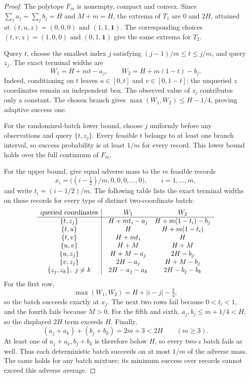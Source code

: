 \documentclass[12pt]{article}
\begin{document}
\begin{proof}
The polytope $F_m$ is nonempty, compact and convex. Since
$\sum_j a_j=\sum_j b_j=H$ and $M+m=H$, the extrema of $T_1$ are
$0$ and $2H$, attained at $(t,u,z)=(0,0,0)$ and $(1,1,\boldsymbol1)$.
The corresponding choices $(t,v,z)=(1,0,0)$ and
$(0,1,\boldsymbol1)$ give the same extrema for $T_2$.

Query $t$, choose the smallest index $j$ satisfying
$(j-1)/m\leq t\leq j/m$, and query $z_j$. The exact terminal widths are
\begin{equation}
 W_1=H+mt-a_j,\qquad W_2=H+m(1-t)-b_j.
 \label{eq:two-target-boundary-widths}
\end{equation}
Indeed, conditioning on $t$ leaves $u\in[0,t]$ and $v\in[0,1-t]$;
the unqueried $z$ coordinates remain an independent box. The observed
value of $z_j$ contributes only a constant. The chosen branch gives
$\max(W_1,W_2)\leq H-1/4$, proving adaptive success one.

For the randomized-batch lower bound, choose $j$ uniformly before any
observations and query $\{t,z_j\}$. Every feasible $t$ belongs to at least
one branch interval, so success probability is at least $1/m$ for every
record. This lower bound holds over the full continuum of $F_m$.

For the upper bound, give equal adverse mass to the $m$ feasible records
\[
 x_i=\bigl((i-\tfrac12)/m,0,0,0,\ldots,0\bigr),
       \qquad i=1,\ldots,m,
\]
and write $t_i=(i-1/2)/m$. The following table lists the exact terminal
widths on these records for every type of distinct two-coordinate batch:
\[
\begin{array}{c|@{\quad}c@{\quad}c}
\text{queried coordinates}&W_1&W_2\\\hline
\{t,z_j\}&H+mt_i-a_j&H+m(1-t_i)-b_j\\
\{t,u\}&H&H+m(1-t_i)\\
\{t,v\}&H+mt_i&H\\
\{u,v\}&H+M&H+M\\
\{u,z_j\}&H+M-a_j&2H-b_j\\
\{v,z_j\}&2H-a_j&H+M-b_j\\
\{z_j,z_k\},\ j\ne k&2H-a_j-a_k&2H-b_j-b_k
\end{array}
\]
For the first row,
\[
 \max(W_1,W_2)=H+|i-j|-\tfrac34,
\]
so the batch succeeds exactly at $x_j$. The next two rows fail because
$0<t_i<1$, and the fourth fails because $M>0$. For the fifth and sixth,
$a_j,b_j\leq m+1/4<H$, so the displayed $2H$ term exceeds $H$.
Finally,
\[
 (a_j+a_k)+(b_j+b_k)=2m+3<2H \qquad(m\geq3).
\]
At least one of $a_j+a_k,b_j+b_k$ is therefore below $H$, so every
two-$z$ batch fails as well. Thus each deterministic batch succeeds on
at most $1/m$ of the adverse mass. The same holds for any batch mixture;
its minimum success over records cannot exceed this adverse average.


\end{proof}
\end{document}
